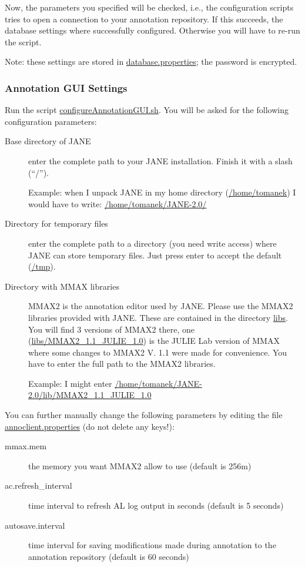 \documentclass[DIV12,english,11pt,halfparskip]{scrartcl}
\begin{document}
Now, the parameters you specified will be checked, i.e., the
configuration scripts tries to open a connection to your annotation
repository. If this succeeds, the database settings where successfully
configured. Otherwise you will have to re-run the script.

Note: these settings are stored in \url{database.properties}; the
password is encrypted.


\subsubsection{Annotation GUI Settings}
Run the script \url{configureAnnotationGUI.sh}. You will be asked for
the following configuration parameters:

\begin{description}
\item [Base directory of JANE] enter the complete path to your JANE
  installation. Finish it with a slash (``/'').

  Example: when I unpack JANE in my home directory (\url{/home/tomanek})
  I would have to write: \url{/home/tomanek/JANE-2.0/}

\item[Directory for temporary files] enter the complete path to a
  directory (you need write access) where JANE can store
  temporary files. Just press enter to accept the default (\url{/tmp}).

\item[Directory with MMAX libraries] MMAX2 is the annotation editor
  used by JANE. Please use the MMAX2 libraries provided with JANE.
  These are contained in the directory \url{libs}.  You will find 3
  versions of MMAX2 there, one (\url{libs/MMAX2_1.1_JULIE_1.0}) is the
  JULIE Lab version of MMAX where some changes to MMAX2 V. 1.1 were
  made for convenience. You have to enter the full path to the MMAX2
  libraries.

  Example: I might enter
  \url{/home/tomanek/JANE-2.0/lib/MMAX2_1.1_JULIE_1.0}
\end{description}

You can further manually change the following parameters by editing the file
\url{annoclient.properties} (do not delete any keys!):

\begin{description}
 \item[mmax.mem] the memory you want MMAX2 allow to use (default is 256m)
 \item[ac.refresh\_interval] time interval to refresh AL log output in
   seconds (default is 5 seconds)
 \item[autosave.interval] time interval for saving modifications made
   during annotation to the annotation repository (default is 60 seconds)
\end{description}
\end{document}
